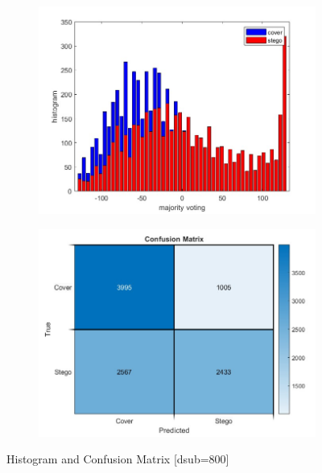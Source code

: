 \begin{figure}[H]
    \begin{subfigure}[b]{0.5\textwidth}
        \includegraphics[width=\textwidth]{img/800/histogramgray.jpg}
    \end{subfigure}
    \hfill
    \begin{subfigure}[b]{0.5\textwidth}
        \includegraphics[width=\textwidth]{img/800/confusegray.jpg}
    \end{subfigure}
    \caption{Histogram and Confusion Matrix [dsub=800]}
\end{figure}


